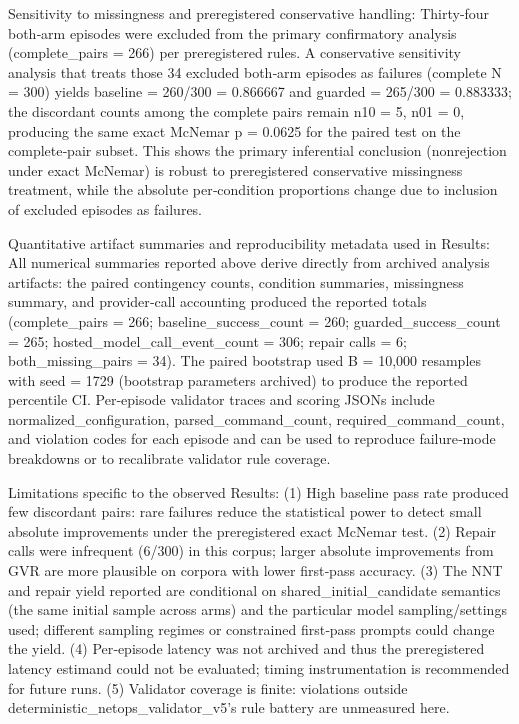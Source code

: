 \documentclass[conference]{IEEEtran}
\begin{document}
Sensitivity to missingness and preregistered conservative handling: Thirty‑four both‑arm episodes were excluded from the primary confirmatory analysis (complete\_pairs = 266) per preregistered rules. A conservative sensitivity analysis that treats those 34 excluded both‑arm episodes as failures (complete N = 300) yields baseline = 260/300 = 0.866667 and guarded = 265/300 = 0.883333; the discordant counts among the complete pairs remain n10 = 5, n01 = 0, producing the same exact McNemar p = 0.0625 for the paired test on the complete‑pair subset. This shows the primary inferential conclusion (nonrejection under exact McNemar) is robust to preregistered conservative missingness treatment, while the absolute per‑condition proportions change due to inclusion of excluded episodes as failures.

Quantitative artifact summaries and reproducibility metadata used in Results: All numerical summaries reported above derive directly from archived analysis artifacts: the paired contingency counts, condition summaries, missingness summary, and provider‑call accounting produced the reported totals (complete\_pairs = 266; baseline\_success\_count = 260; guarded\_success\_count = 265; hosted\_model\_call\_event\_count = 306; repair calls = 6; both\_missing\_pairs = 34). The paired bootstrap used B = 10,000 resamples with seed = 1729 (bootstrap parameters archived) to produce the reported percentile CI. Per‑episode validator traces and scoring JSONs include normalized\_configuration, parsed\_command\_count, required\_command\_count, and violation codes for each episode and can be used to reproduce failure‑mode breakdowns or to recalibrate validator rule coverage.

Limitations specific to the observed Results: (1) High baseline pass rate produced few discordant pairs: rare failures reduce the statistical power to detect small absolute improvements under the preregistered exact McNemar test. (2) Repair calls were infrequent (6/300) in this corpus; larger absolute improvements from GVR are more plausible on corpora with lower first‑pass accuracy. (3) The NNT and repair yield reported are conditional on shared\_initial\_candidate semantics (the same initial sample across arms) and the particular model sampling/settings used; different sampling regimes or constrained first‑pass prompts could change the yield. (4) Per‑episode latency was not archived and thus the preregistered latency estimand could not be evaluated; timing instrumentation is recommended for future runs. (5) Validator coverage is finite: violations outside deterministic\_netops\_validator\_v5's rule battery are unmeasured here.
\end{document}
